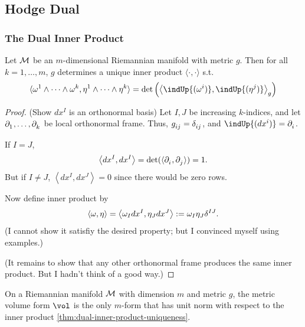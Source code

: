 \documentclass[../main.tex]{subfiles}
\begin{document}
    \subsection{Hodge Dual}
    \subsubsection{The Dual Inner Product}
    \begin{theorem}\label{thm:dual-inner-product-uniqueness}
        Let \(\manifold[M]\) be an \(m\)-dimensional Riemannian manifold with metric 
        \(g\). Then for all \(k = 1, \dots, m\), \(g\) determines a unique inner 
        product \(\langle \cdot, \cdot\rangle\) s.t. 
        \[
        \langle \omega^1 \wedge \dots\wedge \omega^k, 
        \eta^1\wedge\dots\wedge\eta^k\rangle = \det \left(\left\langle
            \indUp{(\omega^i)}, \indUp{(\eta^j)}\right\rangle_g\right)
        \]
    \end{theorem}
    \begin{proof}
        (Show \(dx^I\) is an orthonormal basis)
        Let \(I, J\) be increasing \(k\)-indices, and let \(\tfld{1}, \dots, 
        \tfld{k}\) be local orthonormal frame. Thus, \(g\indices{_i_j}=
        \delta\indices{_i_j}\), and \(\indUp{(dx^i)}=\tfld{i}\).\par
        If \(I = J\),
        \[
        \left\langle dx^I, dx^I\right\rangle = \det 
        (\langle \tfld{i}, \tfld{j}\rangle)=1.
        \]
        But if \(I \neq J\), \(\left\langle dx^I, dx^J\right\rangle=0\) since there 
        would be zero rows.\par
        Now define inner product by 
        \[
        \langle\omega, \eta\rangle=\left\langle \omega_Idx^I, \eta_Jdx^J\right\rangle
        :=\omega_I\eta_J \delta\indices{^I^J}.
        \]
        (I cannot show it satisfiy the desired property; but I convinced myself using 
        examples.)\par
        (It remains to show that any other orthonormal frame produces the same 
        inner product. But I hadn't think of a good way.)
    \end{proof}
    \begin{theorem}\label{thm:volume-form-unit-norm}
        On a Riemannian manifold \(\manifold[M]\) with dimension \(m\) and metric 
        \(g\), the metric volume form \(\vol\) is the only \(m\)-form that has 
        unit norm with respect to the inner product \cref{thm:dual-inner-product-uniqueness}.
    \end{theorem}
\end{document}
